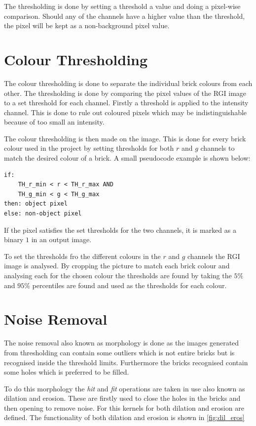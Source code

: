 The thresholding is done by setting a threshold a value and doing a pixel-wise comparison. Should any of the channels have a higher value than the threshold, the pixel will be kept as a non-background pixel value.

\section{Colour Thresholding}
The colour thresholding is done to separate the individual brick colours from each other. The thresholding is done by comparing the pixel values of the RGI image to a set threshold for each channel. Firstly a threshold is applied to the intensity channel. This is done to rule out coloured pixels which may be indistinguishable because of too small an intensity. 

The colour thresholding is then made on the image. This is done for every brick colour used in the project by setting thresholds for both $r$ and $g$ channels to match the desired colour of a brick. A small pseudocode example is shown below:
\lstset{language=Pascal}
\begin{lstlisting}[frame=single]
if: 
	TH_r_min < r < TH_r_max AND
	TH_g_min < g < TH_g_max
then: object pixel
else: non-object pixel
\end{lstlisting}

If the pixel satisfies the set thresholds for the two channels, it is marked as a binary $1$ in an output image.

To set the thresholds fro the different colours in the $r$ and $g$ channels the RGI image is analysed. By cropping the picture to match each brick colour and analysing each for the chosen colour the thresholds are found by taking the $5\%$ and $95\%$ percentiles are found and used as the thresholds for each colour.

\section{Noise Removal}
The noise removal also known as morphology is done as the images generated from thresholding can contain some outliers which is not entire bricks but is recognised inside the threshold limits. Furthermore the bricks recognised contain some holes which is preferred to be filled.

To do this morphology the \textit{hit} and \textit{fit} operations are taken in use also known as dilation and erosion. These are firstly used to close the holes in the bricks and then opening to remove noise.
For this kernels for both dilation and erosion are defined. The functionality of both dilation and erosion is shown in \autoref{fig:dil_eros}

